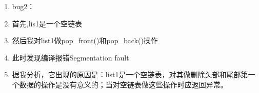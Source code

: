 \documentclass[UTF8]{ctexart}
\begin{document}
\begin{enumerate}

  \item bug2：
  
  \item 首先,lis1是一个空链表
   
  \item 然后我对list1做pop\_front()和pop\_back()操作
  
  \item 此时发现编译报错Segmentation fault
   
  \item 据我分析，它出现的原因是：list1是一个空链表，对其做删除头部和尾部第一个数据的操作是没有意义的；当对空链表做这些操作时应返回异常。
   
\end{enumerate}
\end{document}
